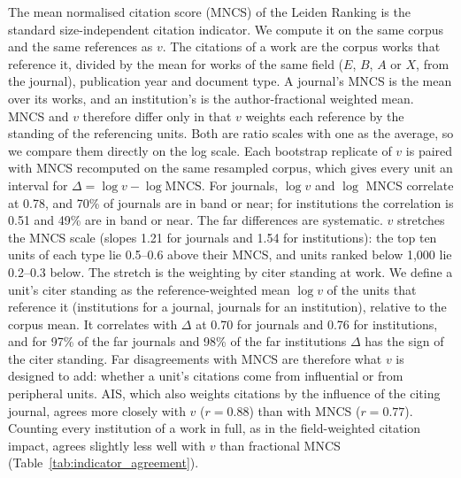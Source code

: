 The mean normalised citation score (MNCS) of the Leiden Ranking \citep{waltmanLeidenRanking20112012} is the standard size-independent citation indicator. We compute it on the same corpus and the same references as $v$. The citations of a work are the corpus works that reference it, divided by the mean for works of the same field ($E$, $B$, $A$ or $X$, from the journal), publication year and document type. A journal's MNCS is the mean over its works, and an institution's is the author-fractional weighted mean. MNCS and $v$ therefore differ only in that $v$ weights each reference by the standing of the referencing units. Both are ratio scales with one as the average, so we compare them directly on the log scale. Each bootstrap replicate of $v$ is paired with MNCS recomputed on the same resampled corpus, which gives every unit an interval for $\Delta=\log v-\log\text{MNCS}$. For journals, $\log v$ and $\log$ MNCS correlate at 0.78, and 70\% of journals are in band or near; for institutions the correlation is 0.51 and 49\% are in band or near. The far differences are systematic. $v$ stretches the MNCS scale (slopes 1.21 for journals and 1.54 for institutions): the top ten units of each type lie 0.5--0.6 above their MNCS, and units ranked below 1,000 lie 0.2--0.3 below. The stretch is the weighting by citer standing at work. We define a unit's citer standing as the reference-weighted mean $\log v$ of the units that reference it (institutions for a journal, journals for an institution), relative to the corpus mean. It correlates with $\Delta$ at 0.70 for journals and 0.76 for institutions, and for 97\% of the far journals and 98\% of the far institutions $\Delta$ has the sign of the citer standing. Far disagreements with MNCS are therefore what $v$ is designed to add: whether a unit's citations come from influential or from peripheral units. AIS, which also weights citations by the influence of the citing journal, agrees more closely with $v$ ($r=0.88$) than with MNCS ($r=0.77$). Counting every institution of a work in full, as in the field-weighted citation impact, agrees slightly less well with $v$ than fractional MNCS (Table~\ref{tab:indicator_agreement}).

